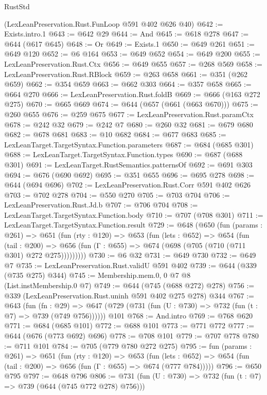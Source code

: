 \begin{lexlean}{RustStd}
\begin{coremodule}
    (LexLeanPreservation.Rust.FunLoop @591 @402 @626 @40)
@642 := Exists.intro.{1}
@643 := @642 @29
@644 := And
@645 := @618 @278
@647 := @644 (@617 @645)
@648 := Or
@649 := Exists.{1}
@650 := @649 @261
@651 := @649 @120
@652 := @6 @164
@653 := @649 @652
@654 := @649 @200
@655 := LexLeanPreservation.Rust.Ctx
@656 := @649 @655
@657 := @268 @569
@658 := LexLeanPreservation.Rust.RBlock
@659 := @263 @658
@661 := @351 (@262 @659)
@662 := @354 @659
@663 := @662 @303
@664 := @357 @658
@665 := @664 @270
@666 := LexLeanPreservation.Rust.foldB
@669 := @666 (@163 @272 @275)
@670 := @665 @669
@674 := @644 (@657 (@661 (@663 @670)))
@675 := @260 @655
@676 := @259 @675
@677 := LexLeanPreservation.Rust.paramCtx
@678 := @242 @32
@679 := @242 @7
@680 := @260 @32
@681 := @679 @680
@682 := @678 @681
@683 := @10 @682
@684 := @677 @683
@685 := LexLeanTarget.TargetSyntax.Function.parameters
@687 := @684 (@685 @301)
@688 := LexLeanTarget.TargetSyntax.Function.types
@690 := @687 (@688 @301)
@691 := LexLeanTarget.RustSemantics.patternsOf
@692 := @691 @303
@694 := @676 (@690 @692)
@695 := @351 @655
@696 := @695 @278
@698 := @644 (@694 @696)
@702 := LexLeanPreservation.Rust.Corr @591 @402 @626
@703 := @702 @278
@704 := @550 @270
@705 := @703 @704
@706 := LexLeanPreservation.Rust.Jd.b
@707 := @706 @704
@708 := LexLeanTarget.TargetSyntax.Function.body
@710 := @707 (@708 @301)
@711 := LexLeanTarget.TargetSyntax.Function.result
@729 := @648
    (@650
      (fun (params : @261) =>
      @651
        (fun (rty : @120) =>
        @653
          (fun (lets : @652) =>
          @654
            (fun (tail : @200) =>
            @656 (fun (Γ : @655) => @674 (@698 (@705 (@710 (@711 @301) @272 @275)))))))))
@730 := @6 @32
@731 := @649 @730
@732 := @649 @7
@735 := LexLeanPreservation.Rust.validU @591 @402
@739 := @644 (@339 (@735 @275) @344)
@745 := Membership.mem.{0, 0} @7 @8 (List.instMembership.{0} @7)
@749 := @644 (@745 (@688 @272) @278)
@756 := @339 (LexLeanPreservation.Rust.uninh @591 @402 @275 @278) @344
@767 := @643
    (fun (fn : @29) =>
    @647 (@729 (@731 (fun (U : @730) => @732 (fun (t : @7) => @739 (@749 @756))))))
    @101
@768 := And.intro
@769 := @768 @620
@771 := @684 (@685 @101)
@772 := @688 @101
@773 := @771 @772
@777 := @644 (@676 (@773 @692) @696)
@778 := @708 @101
@779 := @707 @778
@780 := @711 @101
@784 := @705 (@779 @780 @272 @275)
@795 := fun (params : @261) =>
  @651
    (fun (rty : @120) =>
    @653
      (fun (lets : @652) => @654 (fun (tail : @200) => @656 (fun (Γ : @655) => @674 (@777 @784)))))
@796 := @650 @795
@797 := @648 @796
@806 := @731 (fun (U : @730) => @732 (fun (t : @7) => @739 (@644 (@745 @772 @278) @756)))

\end{coremodule}
\end{lexlean}
